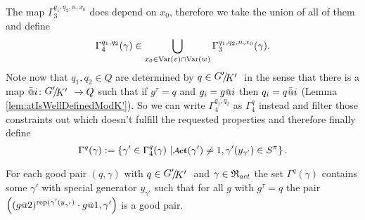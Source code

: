 \documentclass[a4paper,12pt]{article}
\begin{document}
 The map $\Gamma_3^{q_1,q_2,n,x_0}$ does depend on $x_0$, therefore we take the union of all of them and define
  \[\Gamma_4^{q_1,q_2}(\gamma)\in \bigcup_{x_0\in \textup{Var}(v)\cap\textup{Var}(w)}\Gamma_3^{q_1,q_2,n,x_0}(\gamma).\]
 Note now that $q_{1},q_2\in Q$ are determined by $q\in\RNK{G'}{K'}$ in the sense that there is a map $\att{i}\colon \RNK{G'}{K'}\to Q$ such that if $g^\tau = q$ and $g_i=g\at{i}$ 
 then $q_i = q\att{i}$ (Lemma \ref{lem:atIsWellDefinedModK'}). So we can write $\Gamma_4^{q_1,q_2}$ as $\Gamma_4^q$ instead and filter those 
 constraints out which doesn't fulfill the requested properties and therefore finally define
 \[\Gamma^q(\gamma) := \left\{\gamma' \in \Gamma_4^q(\gamma) \bigmid 
  \act(\gamma')\neq 1, \gamma'({y_{\gamma'}}) \in S^\pi \right\}.\]
 \begin{pro}\label{pro:existsNextPair}
 For each good pair $(q,\gamma)$ with $q\in\RNK{G'}{K'}$ and $\gamma\in\mathfrak{R}_{act}$ the set $\Gamma^q(\gamma)$ 
 contains some $\gamma'$ with special generator $y_{\gamma'}$ such that for all $g$ with $g^\tau=q$ the
 pair $\left((g\at{2})^{\textup{rep}(\gamma'(y_{\gamma'})}\cdot g\at{1},\gamma'\right)$ is a good pair.
\end{pro}
\end{document}
